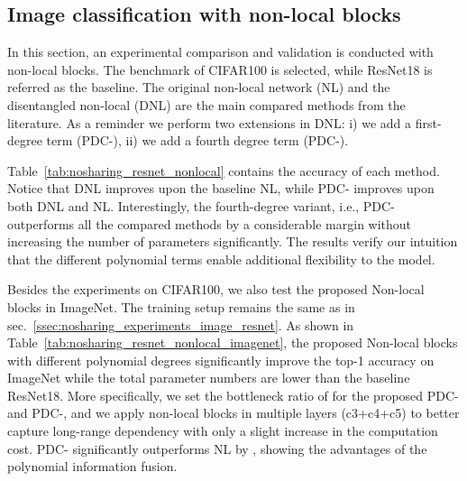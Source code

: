 \documentclass[runningheads]{llncs}
\newcommand{\resnet}{ResNet}
\newcommand{\noshare}{PDC}
\begin{document}
\subsection{Image classification with non-local blocks}
\label{ssec:nosharing_experiments_image_nonlocal}

In this section, an experimental comparison and validation is conducted with non-local blocks. The benchmark of CIFAR100 is selected, while \resnet18 is referred as the baseline. The original non-local network (NL) and the disentangled non-local (DNL) are the main compared methods from the literature. As a reminder we perform two extensions in DNL: i) we add a first-degree term (\noshare-), ii) we add a fourth degree term (\noshare-).

Table~\ref{tab:nosharing_resnet_nonlocal} contains the accuracy of each method. Notice that DNL improves upon the baseline NL, while \noshare- improves upon both DNL and NL. Interestingly, the fourth-degree variant, i.e., \noshare- outperforms all the compared methods by a considerable margin without increasing the number of parameters significantly. The results verify our intuition that the different polynomial terms enable additional flexibility to the model. 

Besides the experiments on CIFAR100, we also test the proposed Non-local blocks in ImageNet. The training setup remains the same as in sec.~\ref{ssec:nosharing_experiments_image_resnet}. As shown in Table~\ref{tab:nosharing_resnet_nonlocal_imagenet}, the proposed Non-local blocks with different polynomial degrees significantly improve the top-1 accuracy on ImageNet while the total parameter numbers are lower than the baseline \resnet18. 
More specifically, we set the bottleneck ratio of  for the proposed \noshare- and \noshare-, and we apply non-local blocks in multiple layers (c3+c4+c5) to better capture long-range dependency with only a slight increase in the computation cost. \noshare- significantly outperforms NL by , showing the advantages of the polynomial information fusion.




     
\end{document}
